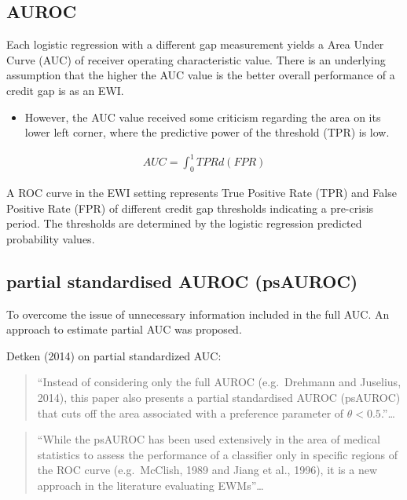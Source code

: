 \documentclass[
  12pt,
]{article}
\providecommand{\tightlist}{%
  \setlength{\itemsep}{0pt}\setlength{\parskip}{0pt}}
\begin{document}
\hypertarget{auroc}{%
\subsection{AUROC}\label{auroc}}

Each logistic regression with a different gap measurement yields a Area Under Curve (AUC) of receiver operating characteristic value. There is an underlying assumption that the higher the AUC value is the better overall performance of a credit gap is as an EWI.

\begin{itemize}
\tightlist
\item
  However, the AUC value received some criticism regarding the area on its lower left corner, where the predictive power of the threshold (TPR) is low.
\end{itemize}

\begin{align*}
AUC = \int_0^1 TPR d(FPR)
\end{align*}

A ROC curve in the EWI setting represents True Positive Rate (TPR) and False Positive Rate (FPR) of different credit gap thresholds indicating a pre-crisis period. The thresholds are determined by the logistic regression predicted probability values.

\hypertarget{partial-standardised-auroc-psauroc}{%
\subsection{partial standardised AUROC (psAUROC)}\label{partial-standardised-auroc-psauroc}}

To overcome the issue of unnecessary information included in the full AUC. An approach to estimate partial AUC was proposed.

Detken (2014) on partial standardized AUC:

\begin{quote}
``Instead of considering only the full AUROC (e.g.~Drehmann and Juselius, 2014), this paper also presents a partial standardised AUROC (psAUROC) that cuts off the area associated with a preference parameter of \(\theta<0.5\).''\ldots{}
\end{quote}

\begin{quote}
``While the psAUROC has been used extensively in the area of medical statistics to assess the performance of a classifier only in specific regions of the ROC curve (e.g.~McClish, 1989 and Jiang et al., 1996), it is a new approach in the literature evaluating EWMs''\ldots{}
\end{quote}
\end{document}

